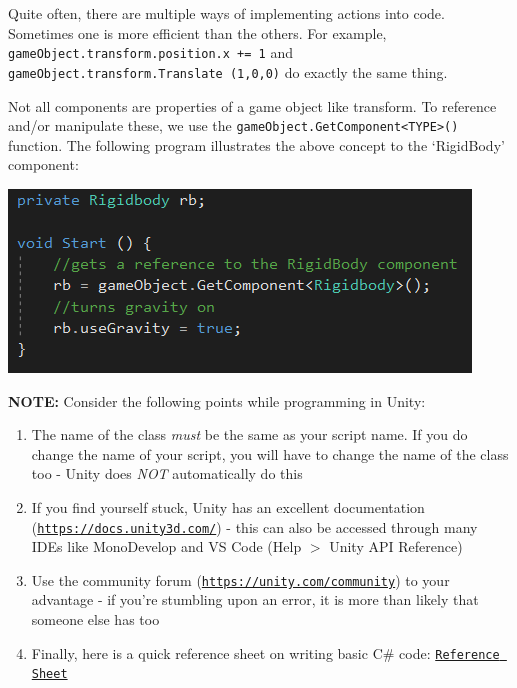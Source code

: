 \documentclass{article}[a4paper,12pt]
\theoremstyle{definition}
\begin{document}
Quite often, there are multiple ways of implementing actions into code. Sometimes one is more efficient than the others. For example, \texttt{gameObject.transform.position.x += 1} and \texttt{gameObject.transform.Translate (1,0,0)} do exactly the same thing.
\vspace{6pt}

Not all components are properties of a game object like transform. To reference and/or manipulate these, we use the \texttt{gameObject.GetComponent<TYPE>()}
function. The following program illustrates the above concept to the `RigidBody' component:
\begin{center}\includegraphics{reference_components.png}\end{center}
\textbf{NOTE:} Consider the following points while programming in Unity:
\begin{enumerate}
	\item The name of the class \textit{must} be the same as your script name. If you do change the name of your script, you will have to change the name of the class too - Unity does \textit{NOT} automatically do this
	\item If you find yourself stuck, Unity has an excellent documentation (\texttt{\href{https://docs.unity3d.com/}{https://docs.unity3d.com/}}) - this can also be accessed through many IDEs like MonoDevelop and VS Code (Help $>$ Unity API Reference)
	\item Use the community forum (\texttt{\href{https://unity.com/community}{https://unity.com/community}}) to your advantage - if you're stumbling upon an error, it is more than likely that someone else has too
	\item Finally, here is a quick reference sheet on writing basic C\# code: \texttt{\href{https://omprabhu31.github.io/gamedev/notes/gamedev_intro/scripting_reference_sheet.pdf}{Reference Sheet}}
\end{enumerate}
\end{document}
